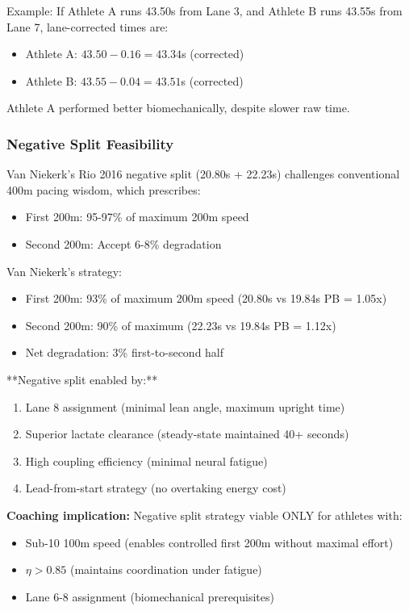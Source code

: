 Example: If Athlete A runs 43.50s from Lane 3, and Athlete B runs 43.55s from Lane 7, lane-corrected times are:
\begin{itemize}
    \item Athlete A: $43.50 - 0.16 = 43.34$s (corrected)
    \item Athlete B: $43.55 - 0.04 = 43.51$s (corrected)
\end{itemize}

Athlete A performed better biomechanically, despite slower raw time.

\subsubsection{Negative Split Feasibility}

Van Niekerk's Rio 2016 negative split (20.80s + 22.23s) challenges conventional 400m pacing wisdom, which prescribes:
\begin{itemize}
    \item First 200m: 95-97\% of maximum 200m speed
    \item Second 200m: Accept 6-8\% degradation
\end{itemize}

Van Niekerk's strategy:
\begin{itemize}
    \item First 200m: 93\% of maximum 200m speed (20.80s vs 19.84s PB = 1.05x)
    \item Second 200m: 90\% of maximum (22.23s vs 19.84s PB = 1.12x)
    \item Net degradation: 3\% first-to-second half
\end{itemize}

**Negative split enabled by:**
\begin{enumerate}
    \item Lane 8 assignment (minimal lean angle, maximum upright time)
    \item Superior lactate clearance (steady-state maintained 40+ seconds)
    \item High coupling efficiency (minimal neural fatigue)
    \item Lead-from-start strategy (no overtaking energy cost)
\end{enumerate}

\textbf{Coaching implication:} Negative split strategy viable ONLY for athletes with:
\begin{itemize}
    \item Sub-10 100m speed (enables controlled first 200m without maximal effort)
    \item $\eta > 0.85$ (maintains coordination under fatigue)
    \item Lane 6-8 assignment (biomechanical prerequisites)
\end{itemize}

